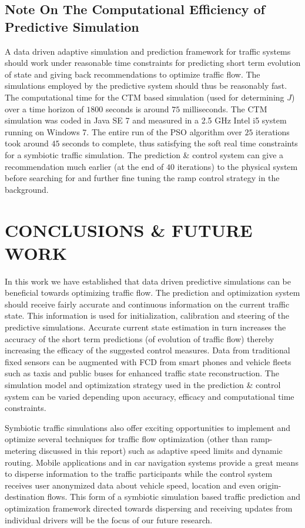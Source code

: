\documentclass[12pt]{article}
\begin{document}
\subsection{Note On The Computational Efficiency of Predictive Simulation}

A data driven adaptive simulation and prediction framework for traffic systems should work under reasonable time constraints for predicting short term evolution of state and giving back recommendations to optimize traffic flow. The simulations employed by the predictive system should thus be reasonably fast. The computational time for the CTM based simulation (used for determining $J$) over a time horizon of $1800$ seconds is around $75$ milliseconds. The CTM simulation was coded in Java SE 7 and measured in a 2.5 GHz Intel i5 system running on Windows 7. The entire run of the PSO algorithm over $25$ iterations took around $45$ seconds to complete, thus satisfying the soft real time constraints for a symbiotic traffic simulation. The prediction \& control system can give a recommendation much earlier (at the end of $40$ iterations) to the physical system before searching for and further fine tuning the ramp control strategy in the background.


\section{CONCLUSIONS \& FUTURE WORK}
\label{sec:conclusion}
In this work we have established that data driven predictive simulations can be beneficial towards optimizing traffic flow.  The prediction and optimization system should receive fairly accurate and continuous information on the current traffic state. This information is used for initialization, calibration and steering of the predictive simulations. Accurate current state estimation in turn increases the accuracy of the short term predictions (of evolution of traffic flow) thereby increasing the efficacy of the suggested control measures. Data from traditional fixed sensors can be augmented with FCD from smart phones and vehicle fleets such as taxis and public buses for enhanced traffic state reconstruction. The simulation model and optimization strategy used in the prediction \& control system can be varied depending upon accuracy, efficacy and computational time constraints.

Symbiotic traffic simulations also offer exciting opportunities to implement and optimize several techniques for traffic flow optimization (other than ramp-metering discussed in this report) such as adaptive speed limits and dynamic routing. Mobile applications and in car navigation systems provide a great means to disperse information to the traffic participants while the control system receives user anonymized data about vehicle speed, location and even origin-destination flows. This form of a symbiotic simulation based traffic prediction and optimization framework directed towards dispersing and receiving updates from individual drivers will be the focus of our future research.
\end{document}
